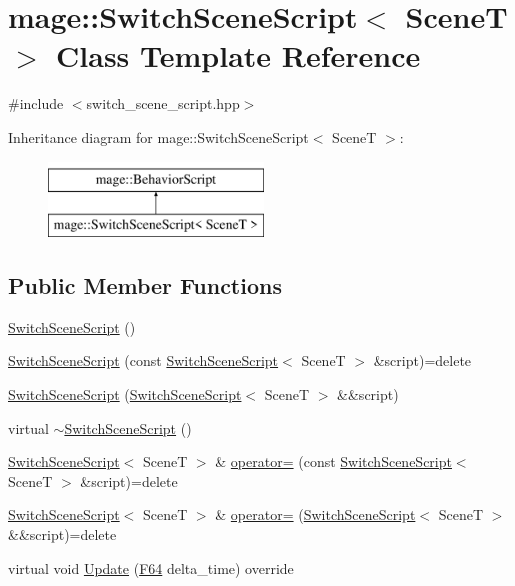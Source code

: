 \hypertarget{classmage_1_1_switch_scene_script}{}\section{mage\+:\+:Switch\+Scene\+Script$<$ SceneT $>$ Class Template Reference}
\label{classmage_1_1_switch_scene_script}


{\ttfamily \#include $<$switch\+\_\+scene\+\_\+script.\+hpp$>$}

Inheritance diagram for mage\+:\+:Switch\+Scene\+Script$<$ SceneT $>$\+:\begin{figure}[H]
\begin{center}
\leavevmode
\includegraphics[height=2.000000cm]{classmage_1_1_switch_scene_script}
\end{center}
\end{figure}
\subsection*{Public Member Functions}
\begin{DoxyCompactItemize}
\item 
\hyperlink{classmage_1_1_switch_scene_script_aefd104d1ddabdd4709c8682e89c79655}{Switch\+Scene\+Script} ()
\item 
\hyperlink{classmage_1_1_switch_scene_script_a307db08624888173ab256b387f07f1c4}{Switch\+Scene\+Script} (const \hyperlink{classmage_1_1_switch_scene_script}{Switch\+Scene\+Script}$<$ SceneT $>$ \&script)=delete
\item 
\hyperlink{classmage_1_1_switch_scene_script_a6803282c82656616ac7459b34e85fdc7}{Switch\+Scene\+Script} (\hyperlink{classmage_1_1_switch_scene_script}{Switch\+Scene\+Script}$<$ SceneT $>$ \&\&script)
\item 
virtual \hyperlink{classmage_1_1_switch_scene_script_a9c5907dfea7512a934e37136a9e3970b}{$\sim$\+Switch\+Scene\+Script} ()
\item 
\hyperlink{classmage_1_1_switch_scene_script}{Switch\+Scene\+Script}$<$ SceneT $>$ \& \hyperlink{classmage_1_1_switch_scene_script_afa17a58d641d05ac406fecb43c84ec2b}{operator=} (const \hyperlink{classmage_1_1_switch_scene_script}{Switch\+Scene\+Script}$<$ SceneT $>$ \&script)=delete
\item 
\hyperlink{classmage_1_1_switch_scene_script}{Switch\+Scene\+Script}$<$ SceneT $>$ \& \hyperlink{classmage_1_1_switch_scene_script_a9f78862b9432a35e9bd606e0be43966a}{operator=} (\hyperlink{classmage_1_1_switch_scene_script}{Switch\+Scene\+Script}$<$ SceneT $>$ \&\&script)=delete
\item 
virtual void \hyperlink{classmage_1_1_switch_scene_script_a30c81a893629c753f19408b552199a07}{Update} (\hyperlink{namespacemage_ad26233bbec640deda836e572c1a23708}{F64} delta\+\_\+time) override
\end{DoxyCompactItemize}
